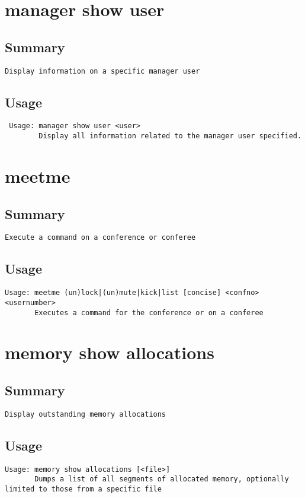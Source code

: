\section{manager show user}
\subsection{Summary}
\begin{verbatim}
Display information on a specific manager user
\end{verbatim}
\subsection{Usage}
\begin{verbatim}
 Usage: manager show user <user>
        Display all information related to the manager user specified.

\end{verbatim}


\section{meetme}
\subsection{Summary}
\begin{verbatim}
Execute a command on a conference or conferee
\end{verbatim}
\subsection{Usage}
\begin{verbatim}
Usage: meetme (un)lock|(un)mute|kick|list [concise] <confno> <usernumber>
       Executes a command for the conference or on a conferee

\end{verbatim}


\section{memory show allocations}
\subsection{Summary}
\begin{verbatim}
Display outstanding memory allocations
\end{verbatim}
\subsection{Usage}
\begin{verbatim}
Usage: memory show allocations [<file>]
       Dumps a list of all segments of allocated memory, optionally
limited to those from a specific file

\end{verbatim}



